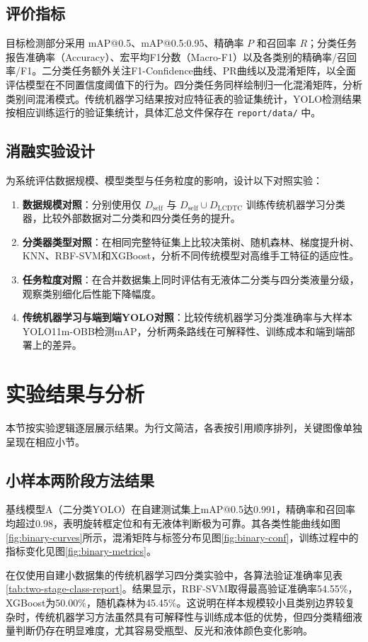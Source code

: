 \documentclass[withoutpreface,bwprint]{cumcmthesis}
\begin{document}
\subsection{评价指标}
目标检测部分采用 mAP@0.5、mAP@0.5:0.95、精确率 $P$ 和召回率 $R$；分类任务报告准确率（Accuracy）、宏平均F1分数（Macro-F1）以及各类别的精确率/召回率/F1。二分类任务额外关注F1-Confidence曲线、PR曲线以及混淆矩阵，以全面评估模型在不同置信度阈值下的行为。四分类任务同样绘制归一化混淆矩阵，分析类别间混淆模式。传统机器学习结果按对应特征表的验证集统计，YOLO检测结果按相应训练运行的验证集统计，具体汇总文件保存在 \texttt{report/data/} 中。

\subsection{消融实验设计}
为系统评估数据规模、模型类型与任务粒度的影响，设计以下对照实验：
\begin{enumerate}
    \item \textbf{数据规模对照}：分别使用仅 $D_{\text{self}}$ 与 $D_{\text{self}}\cup D_{\text{LCDTC}}$ 训练传统机器学习分类器，比较外部数据对二分类和四分类任务的提升。
    \item \textbf{分类器类型对照}：在相同完整特征集上比较决策树、随机森林、梯度提升树、KNN、RBF-SVM和XGBoost，分析不同传统模型对高维手工特征的适应性。
    \item \textbf{任务粒度对照}：在合并数据集上同时评估有无液体二分类与四分类液量分级，观察类别细化后性能下降幅度。
    \item \textbf{传统机器学习与端到端YOLO对照}：比较传统机器学习分类准确率与大样本YOLO11m-OBB检测mAP，分析两条路线在可解释性、训练成本和端到端部署上的差异。
\end{enumerate}
\section{实验结果与分析}
本节按实验逻辑逐层展示结果。为行文简洁，各表按引用顺序排列，关键图像单独呈现在相应小节。

\subsection{小样本两阶段方法结果}
基线模型A（二分类YOLO）在自建测试集上mAP@0.5达0.991，精确率和召回率均超过0.98，表明旋转框定位和有无液体判断极为可靠。其各类性能曲线如图\ref{fig:binary-curves}所示，混淆矩阵与标签分布见图\ref{fig:binary-conf}，训练过程中的指标变化见图\ref{fig:binary-metrics}。

在仅使用自建小数据集的传统机器学习四分类实验中，各算法验证准确率见表\ref{tab:two-stage-class-report}。结果显示，RBF-SVM取得最高验证准确率54.55\%，XGBoost为50.00\%，随机森林为45.45\%。这说明在样本规模较小且类别边界较复杂时，传统机器学习方法虽然具有可解释性与训练成本低的优势，但四分类精细液量判断仍存在明显难度，尤其容易受瓶型、反光和液体颜色变化影响。
\end{document}
